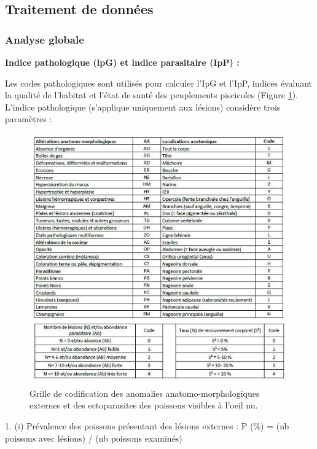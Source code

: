 \documentclass[11pt,titlepage,twoside]{article}\usepackage[]{graphicx}\usepackage[table]{xcolor}
\begin{document}
\subsection{Traitement de données }

\subsubsection{Analyse globale }

\textbf{Indice pathologique (lpG) et indice parasitaire (IpP) :} 


Les codes pathologiques sont utilisés pour calculer l’IpG et l’IpP, indices évaluant la qualité de l’habitat et l’état de santé des peuplements piscicoles \citep{elie_sante_2014} (Figure \ref{Grille}). L’indice pathologique (s’applique uniquement aux lésions) considère trois paramètres : 

\begin{figure}[htpb]
\centering
\includegraphics[width=\textwidth]{Grille}
\caption{Grille de codification des anomalies anatomo-morphologiques externes et des ectoparasites des poissons visibles à l'oeil nu. \citep{elie_sante_2014}}
\label{Grille}
\end{figure}

1.	(i)  Prévalence des poissons présentant des lésions externes : P (\%) = (nb poissons avec lésions) / (nb poissons examinés) 
\end{document}
